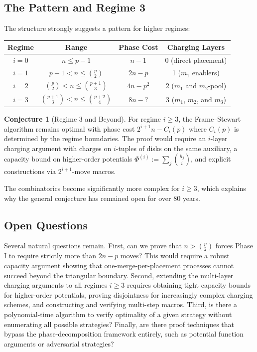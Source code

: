 \documentclass[11pt]{article}
\theoremstyle{definition}
\newtheorem{conjecture}{Conjecture}
\begin{document}
\subsection{The Pattern and Regime 3}

The structure strongly suggests a pattern for higher regimes:

\begin{center}
\renewcommand{\arraystretch}{1.2}
\begin{tabular}{c|c|c|c}
Regime & Range & Phase Cost & Charging Layers \\
\hline
$i=0$ & $n \leq p-1$ & $n-1$ & 0 (direct placement) \\
$i=1$ & $p-1 < n \leq \binom{p}{2}$ & $2n - p$ & 1 ($m_1$ enablers) \\
$i=2$ & $\binom{p}{2} < n \leq \binom{p+1}{3}$ & $4n - p^2$ & 2 ($m_1$ and $m_2$-pool) \\
$i=3$ & $\binom{p+1}{3} < n \leq \binom{p+2}{4}$ & $8n - ?$ & 3 ($m_1$, $m_2$, and $m_3$) \\
\end{tabular}
\end{center}

\begin{conjecture}[Regime 3 and Beyond]
For regime $i \geq 3$, the Frame--Stewart algorithm remains optimal with phase cost $2^{i+1}n - C_i(p)$ where $C_i(p)$ is determined by the regime boundaries. The proof would require an $i$-layer charging argument with charges on $i$-tuples of disks on the same auxiliary, a capacity bound on higher-order potentials $\Phi^{(i)} := \sum_j \binom{h_j}{i}$, and explicit constructions via $2^{i+1}$-move macros.
\end{conjecture}

The combinatorics become significantly more complex for $i \geq 3$, which explains why the general conjecture has remained open for over 80 years.

\subsection{Open Questions}

Several natural questions remain. First, can we prove that $n > \binom{p}{2}$ forces Phase I to require strictly more than $2n-p$ moves? This would require a robust capacity argument showing that one-merge-per-placement processes cannot succeed beyond the triangular boundary. Second, extending the multi-layer charging arguments to all regimes $i \geq 3$ requires obtaining tight capacity bounds for higher-order potentials, proving disjointness for increasingly complex charging schemes, and constructing and verifying multi-step macros. Third, is there a polynomial-time algorithm to verify optimality of a given strategy without enumerating all possible strategies? Finally, are there proof techniques that bypass the phase-decomposition framework entirely, such as potential function arguments or adversarial strategies?
\end{document}
